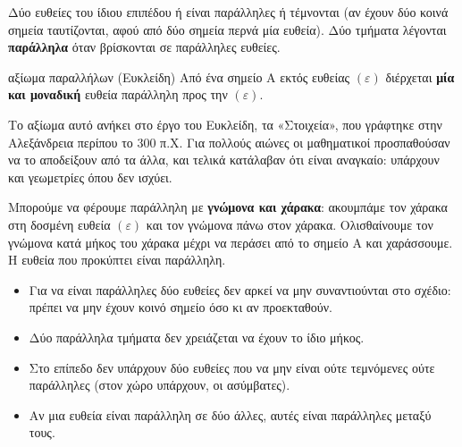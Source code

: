 Δύο ευθείες του ίδιου επιπέδου ή είναι παράλληλες ή τέμνονται (αν έχουν δύο κοινά σημεία ταυτίζονται, αφού από δύο σημεία περνά μία ευθεία). Δύο τμήματα λέγονται \textbf{παράλληλα} όταν βρίσκονται σε παράλληλες ευθείες.

\begin{center}
\end{center}

\begin{idiotita}{αξίωμα παραλλήλων (Ευκλείδη)}
Από ένα σημείο $\mathrm{Α}$ εκτός ευθείας $(\varepsilon)$ διέρχεται \textbf{μία και μοναδική} ευθεία παράλληλη προς την $(\varepsilon)$.
\end{idiotita}

Το αξίωμα αυτό ανήκει στο έργο του Ευκλείδη, τα «Στοιχεία», που γράφτηκε στην Αλεξάνδρεια περίπου το $300$ π.Χ. Για πολλούς αιώνες οι μαθηματικοί προσπαθούσαν να το αποδείξουν από τα άλλα, και τελικά κατάλαβαν ότι είναι αναγκαίο: υπάρχουν και γεωμετρίες όπου δεν ισχύει.

Μπορούμε να φέρουμε παράλληλη με \textbf{γνώμονα και χάρακα}: ακουμπάμε τον χάρακα στη δοσμένη ευθεία $(\varepsilon)$ και τον γνώμονα πάνω στον χάρακα. Ολισθαίνουμε τον γνώμονα κατά μήκος του χάρακα μέχρι να περάσει από το σημείο $\mathrm{Α}$ και χαράσσουμε. Η ευθεία που προκύπτει είναι παράλληλη.

\begin{prosoxi}
\begin{itemize}[leftmargin=1.2em,itemsep=0.3ex,topsep=2pt]
\item Για να είναι παράλληλες δύο ευθείες δεν αρκεί να μην συναντιούνται στο σχέδιο: πρέπει να μην έχουν κοινό σημείο όσο κι αν προεκταθούν.
\item Δύο παράλληλα τμήματα δεν χρειάζεται να έχουν το ίδιο μήκος.
\item Στο επίπεδο δεν υπάρχουν δύο ευθείες που να μην είναι ούτε τεμνόμενες ούτε παράλληλες (στον χώρο υπάρχουν, οι ασύμβατες).
\item Αν μια ευθεία είναι παράλληλη σε δύο άλλες, αυτές είναι παράλληλες μεταξύ τους.
\end{itemize}
\end{prosoxi}

